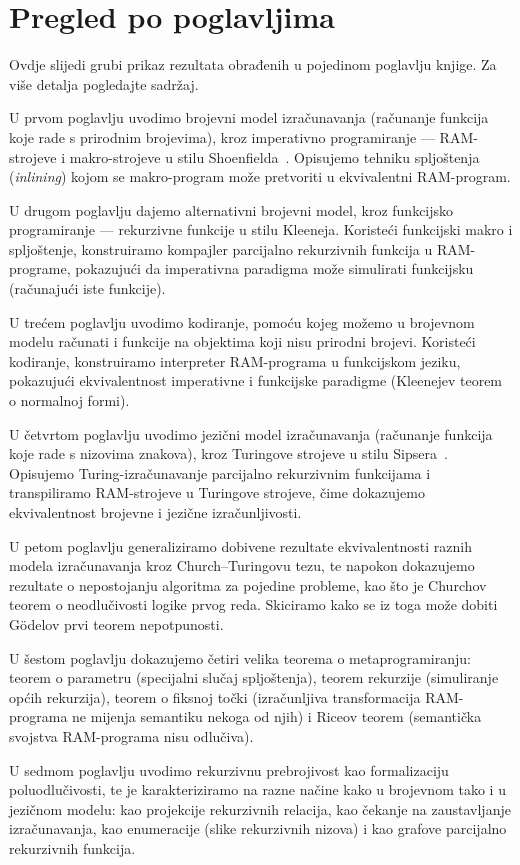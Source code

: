 \section{Pregled po poglavljima}
Ovdje slijedi grubi prikaz rezultata obrađenih u pojedinom poglavlju knjige. Za više detalja pogledajte sadržaj.

U prvom poglavlju uvodimo brojevni model izračunavanja (računanje funkcija koje rade s prirodnim brojevima), kroz imperativno programiranje --- RAM-strojeve i makro-strojeve u stilu Shoenfielda~\cite{shoenfield}. Opisujemo tehniku spljoštenja (\emph{inlining}) kojom se makro-program može pretvoriti u ekvivalentni RAM-program.

U drugom poglavlju dajemo alternativni brojevni model, kroz funkcijsko programiranje --- rekurzivne funkcije u stilu Kleeneja. Koristeći funkcijski makro i spljoštenje, konstruiramo kompajler parcijalno rekurzivnih funkcija u RAM-programe, pokazujući da imperativna paradigma može simulirati funkcijsku (računajući iste funkcije).

U trećem poglavlju uvodimo kodiranje, pomoću kojeg možemo u brojevnom modelu računati i funkcije na objektima koji nisu prirodni brojevi. Koristeći kodiranje, konstruiramo interpreter RAM-programa u funkcijskom jeziku, pokazujući ekvivalentnost imperativne i funkcijske paradigme (Kleenejev teorem o normalnoj formi).

U četvrtom poglavlju uvodimo jezični model izračunavanja (računanje funkcija koje rade s nizovima znakova), kroz Turingove strojeve u stilu Sipsera~\cite{sipser}. Opisujemo Turing-izračunavanje parcijalno rekurzivnim funkcijama i transpiliramo RAM-strojeve u Turingove strojeve, čime dokazujemo ekvivalentnost brojevne i jezične izračunljivosti.

U petom poglavlju generaliziramo dobivene rezultate ekvivalentnosti raznih modela izračunavanja kroz Church--\!Turingovu tezu, te napokon dokazujemo rezultate o nepostojanju algoritma za pojedine probleme, kao što je Churchov teorem o neodlučivosti logike prvog reda. Skiciramo kako se iz toga može dobiti G\"odelov prvi teorem nepotpunosti.

U šestom poglavlju dokazujemo četiri velika teorema o metaprogramiranju: teorem o parametru (specijalni slučaj spljoštenja), teorem rekurzije (simuliranje općih rekurzija), teorem o fiksnoj točki (izračunljiva transformacija RAM-programa ne mijenja semantiku nekoga od njih) i Riceov teorem (semantička svojstva RAM-programa nisu odlučiva).

U sedmom poglavlju uvodimo rekurzivnu prebrojivost kao formalizaciju poluodlučivosti, te je karakteriziramo na razne načine kako u brojevnom tako i u jezičnom modelu: kao projekcije rekurzivnih relacija, kao čekanje na zaustavljanje izračunavanja, kao enumeracije (slike rekurzivnih nizova) i kao grafove parcijalno rekurzivnih funkcija.

